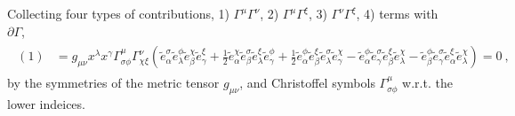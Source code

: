 \documentclass[letterpaper,10pt,english]{jupyterBook}
\begin{document}
\sphinxAtStartPar
Collecting four types of contributions, 1) \(\Gamma^{\mu} \Gamma^{\nu}\), 2) \(\Gamma^{\mu} \Gamma^{\xi}\), 3) \(\Gamma^{\nu} \Gamma^{\xi}\), 4) terms with \(\partial \Gamma\),
\begin{equation*}
\begin{split}\begin{aligned}
  (1)
  & = g_{\mu \nu} x^\lambda x^\gamma \Gamma^{\mu}_{\sigma \phi} \Gamma^{\nu}_{\chi \xi} \left(
  \widetilde{e}^{\sigma}_{\alpha} \widetilde{e}^{\phi}_{\lambda} \widetilde{e}^{\chi}_{\beta} \widetilde{e}^{\xi}_{\gamma}
  + \frac{1}{2} \widetilde{e}^{\chi}_{\alpha} \widetilde{e}^{\sigma}_{\beta} \widetilde{e}^{\xi}_{\lambda} \widetilde{e}^{\phi}_{\gamma}
  + \frac{1}{2} \widetilde{e}^{\phi}_{\alpha} \widetilde{e}^{\xi}_{\beta} \widetilde{e}^{\sigma}_{\lambda} \widetilde{e}^{\chi}_{\gamma}
  - \widetilde{e}^{\phi}_{\alpha} \widetilde{e}^{\sigma}_{\gamma} \widetilde{e}^{\xi}_{\beta  } \widetilde{e}^{\chi}_{\lambda}
  - \widetilde{e}^{\phi}_{\beta } \widetilde{e}^{\sigma}_{\gamma} \widetilde{e}^{\xi}_{\alpha } \widetilde{e}^{\chi}_{\lambda}
  \right) = 0 \ ,
\end{aligned}\end{split}
\end{equation*}
\sphinxAtStartPar
by the symmetries of the metric tensor \(g_{\mu \nu}\), and Christoffel symbols \(\Gamma_{\sigma\phi}^{\mu}\) w.r.t. the lower indeices.
\end{document}

